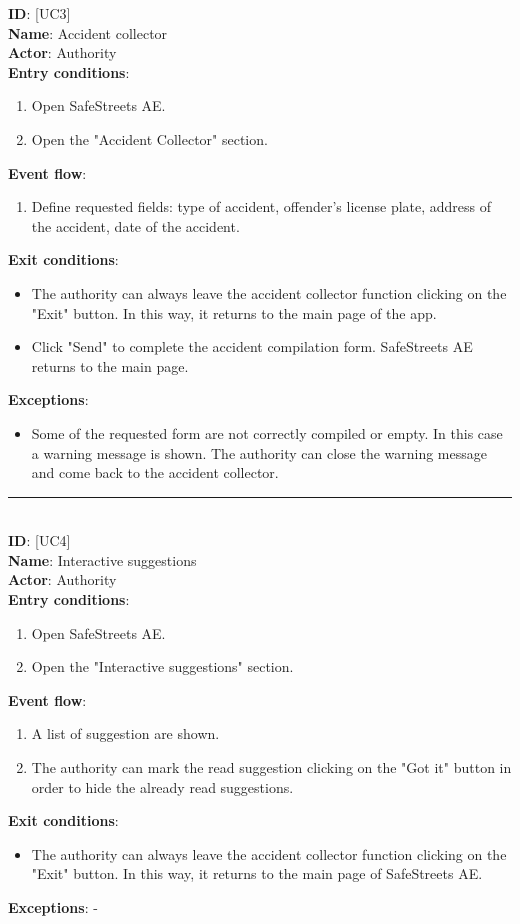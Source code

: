 \documentclass{article}
\newcommand\usecase[1]{ [UC#1] }
\begin{document}
				\textbf{ID}: \usecase{3} \\
				\textbf{Name}:   Accident collector\\
				\textbf{Actor}:  Authority\\
				\textbf{Entry conditions}:
				\begin{enumerate}
					\item Open SafeStreets AE.
					\item Open the "Accident Collector" section.
				\end{enumerate}
				\textbf{Event flow}:
				\begin{enumerate}
					\item Define requested fields: type of accident, offender's license plate, address of the accident, date of the accident.
				\end{enumerate}
				\textbf{Exit conditions}:
				\begin{itemize}
					\item The authority can always leave the accident collector function clicking on the "Exit" button. In this way, it returns to the main page of the app.
					\item Click "Send" to complete the accident compilation form. SafeStreets AE returns to the main page.
				\end{itemize}
				\textbf{Exceptions}:
				\begin{itemize}
					\item Some of the requested form are not correctly compiled or empty. In this case a warning message is shown. The authority can close the warning message and come back to the accident collector.\\
				\end{itemize}
				
				\rule{\linewidth}{0.4pt}
				\\
								
				\textbf{ID}: \usecase{4} \\
				\textbf{Name}:   Interactive suggestions\\
				\textbf{Actor}:  Authority\\
				\textbf{Entry conditions}:
				\begin{enumerate}
					\item Open SafeStreets AE.
					\item Open the "Interactive suggestions" section.
				\end{enumerate}
				\textbf{Event flow}:
				\begin{enumerate}
					\item A list of suggestion are shown.
					\item The authority can mark the read suggestion clicking on the "Got it" button in order to hide the already read suggestions.
				\end{enumerate}
				\textbf{Exit conditions}:
				\begin{itemize}
				   \item The authority can always leave the accident collector function clicking on the "Exit" button. In this way, it returns to the main page of SafeStreets AE.
				\end{itemize}
				\textbf{Exceptions}: -\\
				
\end{document}
